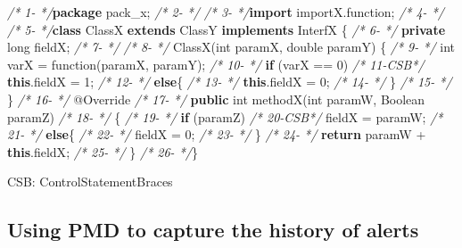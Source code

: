 \documentclass[
]{article}
\newenvironment{Shaded}{\begin{snugshade}}{\end{snugshade}}
\newcommand{\AttributeTok}[1]{\textcolor[rgb]{0.77,0.63,0.00}{#1}}
\newcommand{\BuiltInTok}[1]{#1}
\newcommand{\CommentTok}[1]{\textcolor[rgb]{0.56,0.35,0.01}{\textit{#1}}}
\newcommand{\DataTypeTok}[1]{\textcolor[rgb]{0.13,0.29,0.53}{#1}}
\newcommand{\DecValTok}[1]{\textcolor[rgb]{0.00,0.00,0.81}{#1}}
\newcommand{\FunctionTok}[1]{\textcolor[rgb]{0.00,0.00,0.00}{#1}}
\newcommand{\ImportTok}[1]{#1}
\newcommand{\KeywordTok}[1]{\textcolor[rgb]{0.13,0.29,0.53}{\textbf{#1}}}
\newcommand{\NormalTok}[1]{#1}
\begin{document}
\begin{Shaded}
\begin{Highlighting}[]
\CommentTok{/*  1-   */}\KeywordTok{package}\ImportTok{ pack_x;}
\CommentTok{/*  2-   */}  
\CommentTok{/*  3-   */}\KeywordTok{import}\ImportTok{ importX.function;}
\CommentTok{/*  4-   */}
\CommentTok{/*  5-   */}\KeywordTok{class}\NormalTok{ ClassX }\KeywordTok{extends}\NormalTok{ ClassY }\KeywordTok{implements}\NormalTok{ InterfX \{}
\CommentTok{/*  6-   */}    \KeywordTok{private} \DataTypeTok{long}\NormalTok{ fieldX;}
\CommentTok{/*  7-   */}    
\CommentTok{/*  8-   */}    \FunctionTok{ClassX}\NormalTok{(}\DataTypeTok{int}\NormalTok{ paramX, }\DataTypeTok{double}\NormalTok{ paramY) \{}
\CommentTok{/*  9-   */}        \DataTypeTok{int}\NormalTok{ varX = }\FunctionTok{function}\NormalTok{(paramX, paramY);}
\CommentTok{/* 10-   */}        \KeywordTok{if}\NormalTok{ (varX == }\DecValTok{0}\NormalTok{)}
\CommentTok{/* 11-CSB*/}            \KeywordTok{this}\NormalTok{.}\FunctionTok{fieldX}\NormalTok{ = }\DecValTok{1}\NormalTok{;}
\CommentTok{/* 12-   */}        \KeywordTok{else}\NormalTok{\{}
\CommentTok{/* 13-   */}            \KeywordTok{this}\NormalTok{.}\FunctionTok{fieldX}\NormalTok{ = }\DecValTok{0}\NormalTok{;}
\CommentTok{/* 14-   */}\NormalTok{     \}}
\CommentTok{/* 15-   */}\NormalTok{    \}}
\CommentTok{/* 16-   */}    \AttributeTok{@Override}
\CommentTok{/* 17-   */}    \KeywordTok{public} \DataTypeTok{int} \FunctionTok{methodX}\NormalTok{(}\DataTypeTok{int}\NormalTok{ paramW, }\BuiltInTok{Boolean}\NormalTok{ paramZ)}
\CommentTok{/* 18-   */}\NormalTok{    \{}
\CommentTok{/* 19-   */}        \KeywordTok{if}\NormalTok{ (paramZ)}
\CommentTok{/* 20-CSB*/}\NormalTok{            fieldX = paramW;}
\CommentTok{/* 21-   */}        \KeywordTok{else}\NormalTok{\{}
\CommentTok{/* 22-   */}\NormalTok{            fieldX = }\DecValTok{0}\NormalTok{;}
\CommentTok{/* 23-   */}\NormalTok{     \}}
\CommentTok{/* 24-   */}        \KeywordTok{return}\NormalTok{ paramW + }\KeywordTok{this}\NormalTok{.}\FunctionTok{fieldX}\NormalTok{;}
\CommentTok{/* 25-   */}\NormalTok{     \}}
\CommentTok{/* 26-   */}\NormalTok{\}  }


\NormalTok{CSB: ControlStatementBraces}
\end{Highlighting}
\end{Shaded}

\normalsize

\subsection{Using PMD to capture the history of alerts}\label{history}
\end{document}
